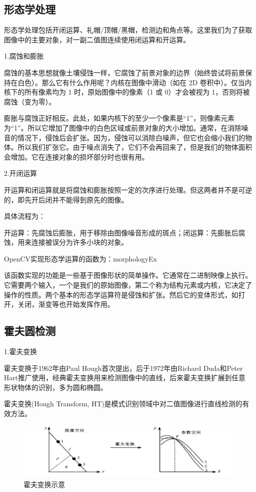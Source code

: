 \subsection{形态学处理}

形态学处理包括开闭运算、礼帽/顶帽/黑帽，检测边和角点等。这里我们为了获取图像中的主要对象，对一副二值图连续使用闭运算和开运算。

1.腐蚀和膨胀

腐蚀的基本思想就像土壤侵蚀一样，它腐蚀了前景对象的边界（始终尝试将前景保持在白色）。那么它有什么作用呢？内核在图像中滑动（如在 2D 卷积中）。仅当内核下的所有像素均为 1 时，原始图像中的像素（1 或 0）才会被视为 1，否则将被腐蚀（变为零）。

膨胀与腐蚀正好相反。此处，如果内核下的至少一个像素是“1”，则像素元素为“1”。所以它增加了图像中的白色区域或前景对象的大小增加。通常，在消除噪音的情况下，侵蚀后会扩张。因为，侵蚀可以消除白噪声，但它也会缩小我们的物体。所以我们扩张它。由于噪点消失了，它们不会再回来了，但是我们的物体面积会增加。它在连接对象的损坏部分时也很有用。

2.开闭运算

开运算和闭运算就是将腐蚀和膨胀按照一定的次序进行处理。但这两者并不是可逆的，即先开后闭并不能得到原先的图像。

具体流程为：

开运算：先腐蚀后膨胀，用于移除由图像噪音形成的斑点；闭运算：先膨胀后腐蚀，用来连接被误分为许多小块的对象。

OpenCV实现形态学运算的函数为：morphologyEx

该函数实现的功能是一些基于图像形状的简单操作。它通常在二进制映像上执行。它需要两个输入，一个是我们的原始图像，第二个称为结构元素或内核，它决定了操作的性质。两个基本的形态学运算符是侵蚀和扩张。然后它的变体形式，如打开，关闭，渐变等也开始发挥作用。

\subsection{霍夫圆检测}

1.霍夫变换

霍夫变换于1962年由Paul Hough首次提出，后于1972年由Richard Duda和Peter Hart推⼴使⽤，经典霍夫变换⽤来检测图像中的直线，后来霍夫变换扩展到任意形状物体的识别，多为圆和椭圆。

霍夫变换(Hough Transform, HT)是模式识别领域中对二值图像进行直线检测的有效方法。

\begin{figure}[ht]
  \centering
  \includegraphics[width=0.8\linewidth]{./Figure/Hough_Transform.png}
  \caption{霍夫变换示意}\label{Fig:xd1}
\end{figure}

